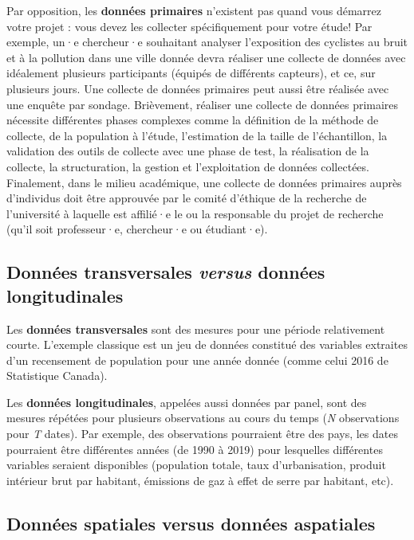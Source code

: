 \documentclass[
  11pt,
  french,
]{book}
\begin{document}
Par opposition, les \textbf{données primaires} n'existent pas quand vous démarrez votre projet : vous devez les collecter spécifiquement pour votre étude! Par exemple, un·e chercheur·e souhaitant analyser l'exposition des cyclistes au bruit et à la pollution dans une ville donnée devra réaliser une collecte de données avec idéalement plusieurs participants (équipés de différents capteurs), et ce, sur plusieurs jours.
Une collecte de données primaires peut aussi être réalisée avec une enquête par sondage. Brièvement, réaliser une collecte de données primaires nécessite différentes phases complexes comme la définition de la méthode de collecte, de la population à l'étude, l'estimation de la taille de l'échantillon, la validation des outils de collecte avec une phase de test, la réalisation de la collecte, la structuration, la gestion et l'exploitation de données collectées. Finalement, dans le milieu académique, une collecte de données primaires auprès d'individus doit être approuvée par le comité d'éthique de la recherche de l'université à laquelle est affilié·e le ou la responsable du projet de recherche (qu'il soit professeur·e, chercheur·e ou étudiant·e).

\hypertarget{sect0222}{%
\subsection{\texorpdfstring{Données transversales \emph{versus} données longitudinales}{Données transversales versus données longitudinales}}\label{sect0222}}

Les \textbf{données transversales} sont des mesures pour une période relativement courte. L'exemple classique est un jeu de données constitué des variables extraites d'un recensement de population pour une année donnée (comme celui 2016 de Statistique Canada).

Les \textbf{données longitudinales}, appelées aussi données par panel, sont des mesures répétées pour plusieurs observations au cours du temps (\emph{N} observations pour \emph{T} dates). Par exemple, des observations pourraient être des pays, les dates pourraient être différentes années (de 1990 à 2019) pour lesquelles différentes variables seraient disponibles (population totale, taux d'urbanisation, produit intérieur brut par habitant, émissions de gaz à effet de serre par habitant, etc).

\hypertarget{sect0223}{%
\subsection{Données spatiales versus données aspatiales}\label{sect0223}}
\end{document}
